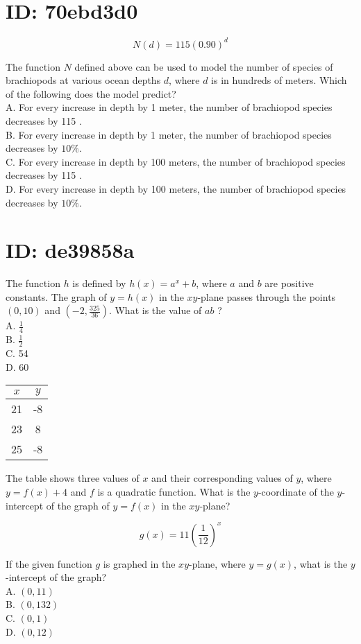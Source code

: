 \section*{ID: 70ebd3d0}
$$
N(d)=115(0.90)^{d}
$$

The function $N$ defined above can be used to model the number of species of brachiopods at various ocean depths $d$, where $d$ is in hundreds of meters. Which of the following does the model predict?\\
A. For every increase in depth by 1 meter, the number of brachiopod species decreases by 115 .\\
B. For every increase in depth by 1 meter, the number of brachiopod species decreases by $10 \%$.\\
C. For every increase in depth by 100 meters, the number of brachiopod species decreases by 115 .\\
D. For every increase in depth by 100 meters, the number of brachiopod species decreases by $10 \%$.

\section*{ID: de39858a}
The function $h$ is defined by $h(x)=a^{x}+b$, where $a$ and $b$ are positive constants. The graph of $y=h(x)$ in the $x y$-plane passes through the points $(0,10)$ and $\left(-2, \frac{325}{36}\right)$. What is the value of $a b$ ?\\
A. $\frac{1}{4}$\\
B. $\frac{1}{2}$\\
C. 54\\
D. 60

\begin{center}
\begin{tabular}{|c|c|}
\hline
$x$ & $y$ \\
\hline
21 & -8 \\
\hline
23 & 8 \\
\hline
25 & -8 \\
\hline
\end{tabular}
\end{center}

The table shows three values of $x$ and their corresponding values of $y$, where $y=f(x)+4$ and $f$ is a quadratic function. What is the $y$-coordinate of the $y$-intercept of the graph of $y=f(x)$ in the $x y$-plane?

$$
g(x)=11\left(\frac{1}{12}\right)^{x}
$$

If the given function $g$ is graphed in the $x y$-plane, where $y=g(x)$, what is the $y$-intercept of the graph?\\
A. $(0,11)$\\
B. $(0,132)$\\
C. $(0,1)$\\
D. $(0,12)$

